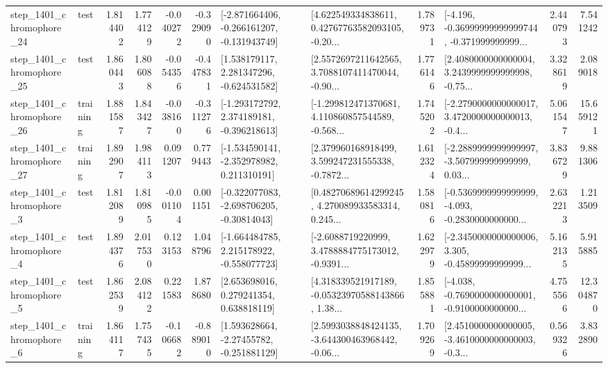 \begin{tabular}{llrrrrllrlrr}
 step\_1401\_chromophore\_24 &      test &      1.814402 &    1.774129 &     -0.040272 & -0.329090 &  [-2.871664406, -0.266161207, -0.131943749] &  [4.622549334838611, 0.42767763582093105, -0.20... &       1.789731 &  [-4.196, -0.36999999999999744, -0.371999999999... &            2.440793 &          7.541242 \\
 step\_1401\_chromophore\_25 &      test &      1.860443 &    1.806088 &     -0.054356 & -0.447831 &    [1.538179117, 2.281347296, -0.624531582] &  [2.5572697211642565, 3.7088107411470044, -0.90... &       1.776146 &  [2.4080000000000004, 3.2439999999999998, -0.75... &            3.328619 &          2.089018 \\
 step\_1401\_chromophore\_26 &  training &      1.881587 &    1.843427 &     -0.038160 & -0.311276 &   [-1.293172792, 2.374189181, -0.396218613] &  [-1.299812471370681, 4.110860857544589, -0.568... &       1.745202 &  [-2.2790000000000017, 3.4720000000000013, -0.4... &            5.061547 &         15.659121 \\
 step\_1401\_chromophore\_27 &  training &      1.892907 &    1.984113 &      0.091207 &  0.779443 &   [-1.534590141, -2.352978982, 0.211310191] &  [2.379960168918499, 3.599247231555338, -0.7872... &       1.612324 &  [-2.2889999999999997, -3.507999999999999, 0.03... &            3.836729 &          9.881306 \\
  step\_1401\_chromophore\_3 &      test &      1.812089 &    1.810985 &     -0.001104 &  0.001151 &   [-0.322077083, -2.698706205, -0.30814043] &  [0.48270689614299245, 4.270089933583314, 0.245... &       1.580816 &  [-0.5369999999999999, -4.093, -0.2830000000000... &            2.632213 &          1.213509 \\
  step\_1401\_chromophore\_4 &      test &      1.894376 &    2.017530 &      0.123153 &  1.048796 &   [-1.664484785, 2.215178922, -0.558077723] &  [-2.6088719220999, 3.4788884775173012, -0.9391... &       1.622979 &  [-2.3450000000000006, 3.305, -0.45899999999999... &            5.162135 &          5.915885 \\
  step\_1401\_chromophore\_5 &      test &      1.862539 &    2.084122 &      0.221583 &  1.878680 &     [2.653698016, 0.279241354, 0.638818119] &  [4.318339521917189, -0.05323970588143866, 1.38... &       1.855881 &  [-4.038, -0.7690000000000001, -0.9100000000000... &            4.755566 &         12.304870 \\
  step\_1401\_chromophore\_6 &  training &      1.864117 &    1.757435 &     -0.106682 & -0.889010 &    [1.593628664, -2.27455782, -0.251881129] &  [2.5993038848424135, -3.644300463968442, -0.06... &       1.709269 &  [2.4510000000000005, -3.4610000000000003, -0.3... &            0.569326 &          3.832890 \\

\end{tabular}
